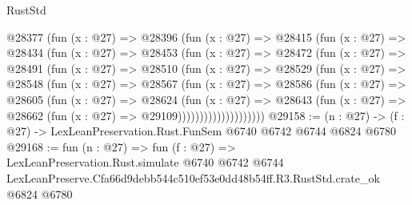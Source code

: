 \begin{lexlean}{RustStd}
\begin{coremodule}
          @28377
            (fun (x : @27) =>
            @28396
              (fun (x : @27) =>
              @28415
                (fun (x : @27) =>
                @28434
                  (fun (x : @27) =>
                  @28453
                    (fun (x : @27) =>
                    @28472
                      (fun (x : @27) =>
                      @28491
                        (fun (x : @27) =>
                        @28510
                          (fun (x : @27) =>
                          @28529
                            (fun (x : @27) =>
                            @28548
                              (fun (x : @27) =>
                              @28567
                                (fun (x : @27) =>
                                @28586
                                  (fun (x : @27) =>
                                  @28605
                                    (fun (x : @27) =>
                                    @28624
                                      (fun (x : @27) =>
                                      @28643
                                        (fun (x : @27) =>
                                        @28662 (fun (x : @27) => @29109))))))))))))))))))))
@29158 := (n : @27) -> (f : @27) -> LexLeanPreservation.Rust.FunSem @6740 @6742 @6744 @6824 @6780
@29168 := fun (n : @27) =>
  fun (f : @27) =>
  LexLeanPreservation.Rust.simulate
    @6740
    @6742
    @6744
    LexLeanPreserve.Cfa66d9debb544c510ef53e0dd48b54ff.R3.RustStd.crate_ok
    @6824
    @6780
\end{coremodule}
\end{lexlean}
